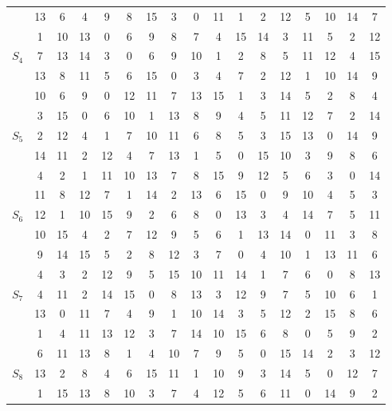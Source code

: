 \documentclass{article}
\begin{document}
\begin{enumerate}
\begin{enumerate}[(a)]
\begin{center}
\begin{tabular}{c|cccccccccccccccc}
& 13 & 6 & 4 & 9 & 8 & 15 & 3 & 0 & 11 & 1 & 2 & 12 & 5 & 10 & 14 & 7 \\  
& 1 & 10 & 13 & 0 & 6 & 9 & 8 & 7 & 4 & 15 & 14 & 3 & 11 & 5 & 2 & 12 \\\hline
\multirow{4}{*}{$S_4$} & 7 & 13 & 14 & 3 & 0 & 6 & 9 & 10 & 1 & 2 & 8 & 5 & 11 & 12 & 4 & 15 \\  
& 13 & 8 & 11 & 5 & 6 & 15 & 0 & 3 & 4 & 7 & 2 & 12 & 1 & 10 & 14 & 9 \\  
& 10 & 6 & 9 & 0 & 12 & 11 & 7 & 13 & 15 & 1 & 3 & 14 & 5 & 2 & 8 & 4 \\  
& 3 & 15 & 0 & 6 & 10 & 1 & 13 & 8 & 9 & 4 & 5 & 11 & 12 & 7 & 2 & 14 \\\hline                                                                     
\multirow{4}{*}{$S_5$} & 2 & 12 & 4 & 1 & 7 & 10 & 11 & 6 & 8 & 5 & 3 & 15 & 13 & 0 & 14 & 9 \\  
& 14 & 11 & 2 & 12 & 4 & 7 & 13 & 1 & 5 & 0 & 15 & 10 & 3 & 9 & 8 & 6 \\  
& 4 & 2 & 1 & 11 & 10 & 13 & 7 & 8 & 15 & 9 & 12 & 5 & 6 & 3 & 0 & 14 \\  
& 11 & 8 & 12 & 7 & 1 & 14 & 2 & 13 & 6 & 15 & 0 & 9 & 10 & 4 & 5 & 3 \\\hline                                                                     
\multirow{4}{*}{$S_6$} & 12 & 1 & 10 & 15 & 9 & 2 & 6 & 8 & 0 & 13 & 3 & 4 & 14 & 7 & 5 & 11 \\  
& 10 & 15 & 4 & 2 & 7 & 12 & 9 & 5 & 6 & 1 & 13 & 14 & 0 & 11 & 3 & 8 \\  
& 9 & 14 & 15 & 5 & 2 & 8 & 12 & 3 & 7 & 0 & 4 & 10 & 1 & 13 & 11 & 6 \\  
& 4 & 3 & 2 & 12 & 9 & 5 & 15 & 10 & 11 & 14 & 1 & 7 & 6 & 0 & 8 & 13 \\\hline                                                                     
\multirow{4}{*}{$S_7$} & 4 & 11 & 2 & 14 & 15 & 0 & 8 & 13 & 3 & 12 & 9 & 7 & 5 & 10 & 6 & 1 \\  
& 13 & 0 & 11 & 7 & 4 & 9 & 1 & 10 & 14 & 3 & 5 & 12 & 2 & 15 & 8 & 6 \\  
& 1 & 4 & 11 & 13 & 12 & 3 & 7 & 14 & 10 & 15 & 6 & 8 & 0 & 5 & 9 & 2 \\  
& 6 & 11 & 13 & 8 & 1 & 4 & 10 & 7 & 9 & 5 & 0 & 15 & 14 & 2 & 3 & 12 \\\hline                                                                     
\multirow{4}{*}{$S_8$} & 13 & 2 & 8 & 4 & 6 & 15 & 11 & 1 & 10 & 9 & 3 & 14 & 5 & 0 & 12 & 7 \\  
& 1 & 15 & 13 & 8 & 10 & 3 & 7 & 4 & 12 & 5 & 6 & 11 & 0 & 14 & 9 & 2 \\  

\end{tabular}
\end{center}
\end{enumerate}
\end{enumerate}
\end{document}
